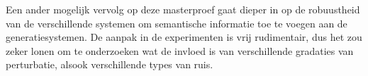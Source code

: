 Een ander mogelijk vervolg op deze masterproef gaat dieper in op de robuustheid van de verschillende systemen om semantische informatie toe te voegen aan de generatiesystemen.
De aanpak in de experimenten is vrij rudimentair, dus het zou zeker lonen om te onderzoeken wat de invloed is van verschillende gradaties van perturbatie, alsook verschillende types van ruis.
